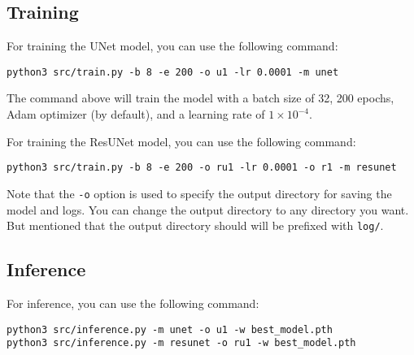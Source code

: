 \subsection{Training}

For training the UNet model, you can use the following command:

\begin{verbatim}
python3 src/train.py -b 8 -e 200 -o u1 -lr 0.0001 -m unet
\end{verbatim}

The command above will train the model with a batch size of 32, 200 epochs, Adam optimizer (by default), and a learning rate of $1 \times 10^{-4}$.

For training the ResUNet model, you can use the following command:

\begin{verbatim}
python3 src/train.py -b 8 -e 200 -o ru1 -lr 0.0001 -o r1 -m resunet
\end{verbatim}

Note that the \texttt{-o} option is used to specify the output directory for saving the model and logs. You can change the output directory to any directory you want.
But mentioned that the output directory should will be prefixed with \texttt{log/}.

\subsection{Inference}

For inference, you can use the following command:

\begin{verbatim}
python3 src/inference.py -m unet -o u1 -w best_model.pth
python3 src/inference.py -m resunet -o ru1 -w best_model.pth
\end{verbatim}
